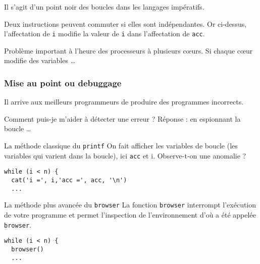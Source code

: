 \documentclass[10pt]{beamer}
\begin{document}
\begin{frame}[fragile]
Il s'agit d'un point noir des boucles dans les langages impératifs.

\begin{alertblock}{Deux instructions peuvent commuter si elles sont indépendantes.}
Or ci-dessus, l'affectation de \texttt{i} modifie la valeur de \texttt{i} dans l'affectation de \texttt{acc}.
\end{alertblock}


\begin{block}{Problème important à l'heure des processeurs à plusieurs c{\oe}urs.}
 Si chaque c{\oe}ur modifie des variables \dots
\end{block}

\end{frame}


\begin{frame}[fragile]
  \frametitle{Mise au point ou debuggage}
  Il arrive aux meilleurs programmeurs de produire des programmes incorrects.
  \begin{alertblock}{Comment puis-je m'aider à détecter une erreur ?}
    Réponse : en espionnant la boucle \dots
  \end{alertblock}

  \begin{block}{La méthode classique du \texttt{printf}}
    On fait afficher les variables de boucle (les variables qui varient dans la boucle), ici \texttt{acc} et {i}. \alert{Observe-t-on une anomalie ?}
  \begin{lstlisting}
while (i < n) {
  cat('i =', i,'acc =', acc, '\n')
  ...
\end{lstlisting}

\end{block}

    \begin{block}{La méthode plus avancée du \texttt{browser}}
      La fonction \texttt{browser} interrompt l'exécution de votre programme et permet l'inspection de l'environnement d'où a été appelée \texttt{browser}.
  \begin{lstlisting}
while (i < n) {
  browser()
  ...
\end{lstlisting}
\end{block}
\end{frame}
\end{document}
